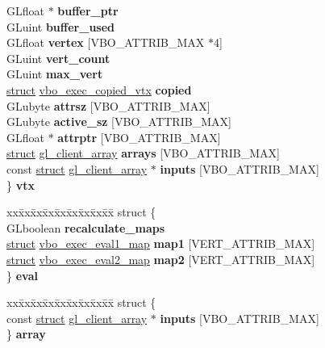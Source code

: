 \begin{DoxyCompactItemize}
\begin{tabbing}
\>GLfloat $\ast$ {\bfseries buffer\_ptr}\\
\>GLuint {\bfseries buffer\_used}\\
\>GLfloat {\bfseries vertex} \mbox{[}VBO\_ATTRIB\_MAX $\ast$4\mbox{]}\\
\>GLuint {\bfseries vert\_count}\\
\>GLuint {\bfseries max\_vert}\\
\>\hyperlink{interfacestruct}{struct} \hyperlink{structvbo__exec__copied__vtx}{vbo\_exec\_copied\_vtx} {\bfseries copied}\\
\>GLubyte {\bfseries attrsz} \mbox{[}VBO\_ATTRIB\_MAX\mbox{]}\\
\>GLubyte {\bfseries active\_sz} \mbox{[}VBO\_ATTRIB\_MAX\mbox{]}\\
\>GLfloat $\ast$ {\bfseries attrptr} \mbox{[}VBO\_ATTRIB\_MAX\mbox{]}\\
\>\hyperlink{interfacestruct}{struct} \hyperlink{structgl__client__array}{gl\_client\_array} {\bfseries arrays} \mbox{[}VBO\_ATTRIB\_MAX\mbox{]}\\
\>const \hyperlink{interfacestruct}{struct} \hyperlink{structgl__client__array}{gl\_client\_array} $\ast$ {\bfseries inputs} \mbox{[}VBO\_ATTRIB\_MAX\mbox{]}\\
\} {\bfseries vtx}\\

\end{tabbing}\item 
\mbox{\label{structvbo__exec__context_a2733016b11dbde43c79ab08036de5383}} 
\begin{tabbing}
xx\=xx\=xx\=xx\=xx\=xx\=xx\=xx\=xx\=\kill
struct \{\\
\>GLboolean {\bfseries recalculate\_maps}\\
\>\hyperlink{interfacestruct}{struct} \hyperlink{structvbo__exec__eval1__map}{vbo\_exec\_eval1\_map} {\bfseries map1} \mbox{[}VERT\_ATTRIB\_MAX\mbox{]}\\
\>\hyperlink{interfacestruct}{struct} \hyperlink{structvbo__exec__eval2__map}{vbo\_exec\_eval2\_map} {\bfseries map2} \mbox{[}VERT\_ATTRIB\_MAX\mbox{]}\\
\} {\bfseries eval}\\

\end{tabbing}\item 
\mbox{\label{structvbo__exec__context_a47f2e2cbb28d436bd8f2ee5c8e2fbf69}} 
\begin{tabbing}
xx\=xx\=xx\=xx\=xx\=xx\=xx\=xx\=xx\=\kill
struct \{\\
\>const \hyperlink{interfacestruct}{struct} \hyperlink{structgl__client__array}{gl\_client\_array} $\ast$ {\bfseries inputs} \mbox{[}VBO\_ATTRIB\_MAX\mbox{]}\\
\} {\bfseries array}\\


\end{tabbing}
\end{DoxyCompactItemize}
